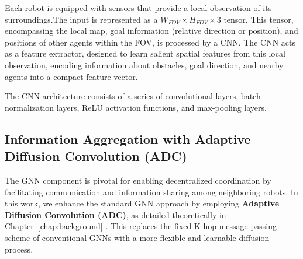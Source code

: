 Each robot is equipped with sensors that provide a local observation of its surroundings.The input is represented as a $W_{FOV} \times H_{FOV} \times 3$ tensor. This tensor, encompassing the local map, goal information (relative direction or position), and positions of other agents within the FOV, is processed by a CNN. The CNN acts as a feature extractor, designed to learn salient spatial features from this local observation, encoding information about obstacles, goal direction, and nearby agents into a compact feature vector.

The CNN architecture consists of a series of convolutional layers, batch normalization layers, ReLU activation functions, and max-pooling layers.

\subsection{Information Aggregation with Adaptive Diffusion Convolution (ADC)}
\label{subsec:adc_aggregation}

The GNN component is pivotal for enabling decentralized coordination by facilitating communication and information sharing among neighboring robots. In this work, we enhance the standard GNN approach by employing \textbf{Adaptive Diffusion Convolution (ADC)}, as detailed theoretically in Chapter~\ref{chap:background} . This replaces the fixed K-hop message passing scheme of conventional GNNs with a more flexible and learnable diffusion process.

